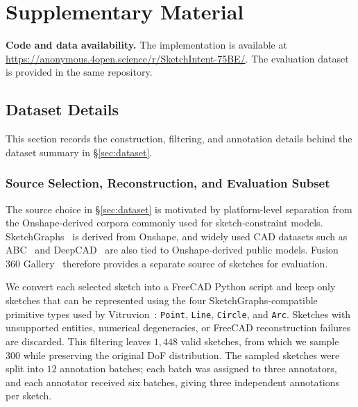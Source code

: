 \clearpage
\appendix
\section{Supplementary Material}
\label{sec:supplementary}

\noindent\textbf{Code and data availability.}
The implementation is available at \url{https://anonymous.4open.science/r/SketchIntent-75BE/}. The evaluation dataset is provided in the same repository.

\localtableofcontents

\subsection{Dataset Details}
\label{sec:appendix_dataset}
This section records the construction, filtering, and annotation details behind the dataset summary in \S\ref{sec:dataset}.

\subsubsection{Source Selection, Reconstruction, and Evaluation Subset}
\label{sec:appendix_dataset_source}
The source choice in \S\ref{sec:dataset} is motivated by platform-level separation from the Onshape-derived corpora commonly used for sketch-constraint models. SketchGraphs~\cite{seff2020sketchgraphs} is derived from Onshape, and widely used CAD datasets such as ABC~\cite{Koch_2019_CVPR} and DeepCAD~\cite{Wu_2021_ICCV} are also tied to Onshape-derived public models. Fusion 360 Gallery~\cite{willis2020fusion} therefore provides a separate source of sketches for evaluation.

We convert each selected sketch into a FreeCAD Python script and keep only sketches that can be represented using the four SketchGraphs-compatible primitive types used by Vitruvion~\cite{seff2021vitruvion}: \texttt{Point}, \texttt{Line}, \texttt{Circle}, and \texttt{Arc}. Sketches with unsupported entities, numerical degeneracies, or FreeCAD reconstruction failures are discarded. This filtering leaves $1{,}448$ valid sketches, from which we sample $300$ while preserving the original DoF distribution. The sampled sketches were split into $12$ annotation batches; each batch was assigned to three annotators, and each annotator received six batches, giving three independent annotations per sketch.

